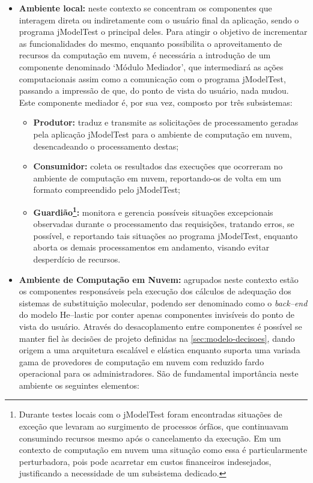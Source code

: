 \documentclass[english,brazilian]{UNISINOSmonografia} %
\begin{document}
\begin{itemize}
	
	\item \textbf{Ambiente local:} 
	neste contexto se concentram os componentes que interagem direta ou indiretamente com o usuário final da aplicação, sendo o programa jModelTest o principal deles.
	Para atingir o objetivo de incrementar as funcionalidades do mesmo, enquanto possibilita o aproveitamento de recursos da computação em nuvem, é necessária a introdução de um componente denominado \textquoteleft Módulo Mediador\textquoteright, que intermediará as ações computacionais assim como a comunicação com o programa jModelTest, passando a impressão de que, do ponto de vista do usuário, nada mudou.
	Este componente mediador é, por sua vez, composto por três subsistemas: 
	\begin{itemize}
		
		\item \textbf{Produtor:} traduz e transmite as solicitações de processamento geradas pela aplicação jModelTest para o ambiente de computação em nuvem, desencadeando o processamento destas;
		
		\item \textbf{Consumidor:} coleta os resultados das execuções que ocorreram no ambiente de computação em nuvem, reportando-os de volta em um formato compreendido pelo jModelTest;
		
		\item \textbf{Guardião\footnote{
	Durante testes locais com o jModelTest foram encontradas situações de exceção que levaram ao surgimento de processos órfãos, que continuavam consumindo recursos mesmo após o cancelamento da execução. Em um contexto de computação em nuvem uma situação como essa é particularmente perturbadora, pois pode acarretar em custos financeiros indesejados, justificando a necessidade de um subsistema dedicado.
}:}
		monitora e gerencia possíveis situações excepcionais observadas durante o processamento das requisições, tratando erros, se possível, e reportando tais situações ao programa jModelTest, enquanto aborta os demais processamentos em andamento, visando evitar desperdício de recursos.
		
	\end{itemize}

	
	\item \textbf{Ambiente de Computação em Nuvem:} 
	agrupados neste contexto estão os componentes responsáveis pela execução dos cálculos de adequação dos sistemas de substituição molecular, podendo ser denominado como o \textit{back--end} do modelo \textsf{He}--lastic por conter apenas componentes invisíveis do ponto de vista do usuário.
	Através do desacoplamento entre componentes é possível se manter fiel às decisões de projeto definidas na \autoref{sec:modelo-decisoes}, dando origem a uma arquitetura escalável e elástica enquanto suporta uma variada gama de provedores de computação em nuvem com reduzido fardo operacional para os administradores.
	São de fundamental importância neste ambiente os seguintes elementos:
	

\end{itemize}
\end{document}
